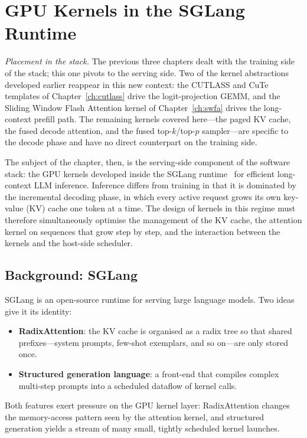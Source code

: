 \chapter{GPU Kernels in the SGLang Runtime}\label{ch:sglang}

\emph{Placement in the stack.} The previous three chapters dealt
with the training side of the stack; this one pivots to the
serving side. Two of the kernel abstractions developed earlier
reappear in this new context: the CUTLASS and CuTe templates of
Chapter~\ref{ch:cutlass} drive the logit-projection GEMM, and the
Sliding Window Flash Attention kernel of Chapter~\ref{ch:swfa}
drives the long-context prefill path. The remaining kernels
covered here---the paged KV cache, the fused decode attention,
and the fused top-$k$/top-$p$ sampler---are specific to the
decode phase and have no direct counterpart on the training side.

The subject of the chapter, then, is the serving-side component of
the software stack: the GPU kernels developed inside the SGLang
runtime~\cite{sglang} for efficient long-context LLM inference.
Inference differs from training in that it is dominated by the
incremental decoding phase, in which every active request grows
its own key-value (KV) cache one token at a time. The design of
kernels in this regime must therefore simultaneously optimise the
management of the KV cache, the attention kernel on sequences that
grow step by step, and the interaction between the kernels and the
host-side scheduler.

\section{Background: SGLang}\label{sec:sglang_bg}
SGLang is an open-source runtime for serving large language
models. Two ideas give it its identity:
\begin{itemize}
    \item \textbf{RadixAttention}: the KV cache is organised as a
          radix tree so that shared prefixes---system prompts,
          few-shot exemplars, and so on---are only stored once.
    \item \textbf{Structured generation language}: a front-end
          that compiles complex multi-step prompts into a
          scheduled dataflow of kernel calls.
\end{itemize}
Both features exert pressure on the GPU kernel layer:
RadixAttention changes the memory-access pattern seen by the
attention kernel, and structured generation yields a stream of
many small, tightly scheduled kernel launches.

